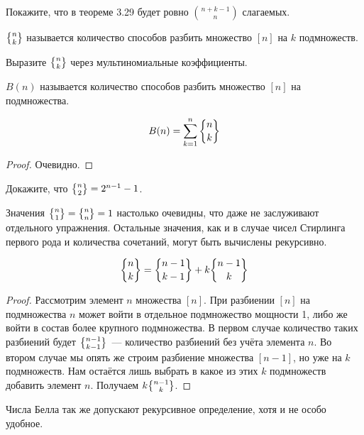 \begin{exercise}
Покажите, что в теореме 3.29 будет ровно $n + k - 1 \choose n$ слагаемых.
\end{exercise}

\begin{definition}
 $\sstirling{n}{k}$ называется количество способов разбить множество $[n]$ на $k$ подмножеств.
\end{definition}

\begin{exercise}
Выразите $\sstirling{n}{k}$ через мультиномиальные коэффициенты.
\end{exercise}

\begin{definition}
 $B(n)$ называется количество способов разбить множество $[n]$ на подмножества.
\end{definition}

\begin{thm}
$$B(n) = \sum_{k=1}^n\sstirling{n}{k}$$
\end{thm}
\begin{proof}
Очевидно.
\end{proof}

\begin{exercise}
Докажите, что $\sstirling{n}{2} = 2^{n-1} - 1$.
\end{exercise}

Значения $\sstirling{n}{1} = \sstirling{n}{n} = 1$ настолько очевидны, что даже не заслуживают отдельного упражнения. Остальные значения, как и в случае чисел Стирлинга первого рода и количества сочетаний, могут быть вычислены рекурсивно.

\begin{thm}
$$\sstirling{n}{k} = \sstirling{n-1}{k-1} + k\sstirling{n-1}{k}$$
\end{thm}
\begin{proof}
Рассмотрим элемент $n$ множества $[n]$. При разбиении $[n]$ на подмножества $n$ может войти в отдельное подмножество мощности 1, либо же войти в состав более крупного подмножества. В первом случае количество таких разбиений будет $\sstirling{n-1}{k-1}$~--- количество разбиений без учёта элемента $n$. Во втором случае мы опять же строим разбиение множества $[n-1]$, но уже на $k$ подмножеств. Нам остаётся лишь выбрать в какое из этих $k$ подмножеств добавить элемент $n$. Получаем $k\sstirling{n-1}{k}$.
\end{proof}

Числа Белла так же допускают рекурсивное определение, хотя и не особо удобное.


